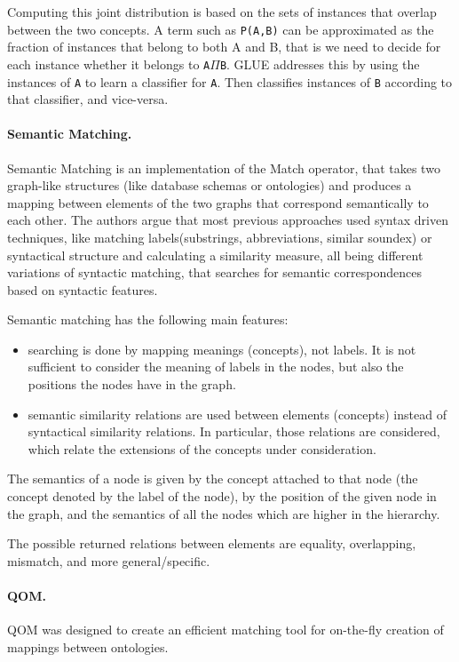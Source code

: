 \documentclass{fast_latex}
\begin{document}
Computing this joint distribution is based on the sets of instances that
overlap between the two concepts. A term such as
\texttt{P(A,B)} can be approximated as the fraction of
instances that belong to both A and B, that is we need to decide for
each instance whether it belongs to \texttt{A${\Pi}$B}.
GLUE addresses this by using the instances of \texttt{A}
to learn a classifier for \texttt{A}. Then classifies
instances of \texttt{B} according to that classifier, and
vice-versa.

\paragraph{Semantic Matching.}
Semantic Matching \cite{giunchiglia2004semantic_matching} is an implementation of
the Match operator, that takes two graph-like structures (like database
schemas or ontologies) and produces a mapping between elements of the
two graphs that correspond semantically to each other. The authors
argue that most previous approaches used syntax driven techniques, like
matching labels(substrings, abbreviations, similar soundex) or
syntactical structure and calculating a similarity measure, all being
different variations of syntactic matching, that searches for semantic
correspondences based on syntactic features. 

Semantic matching has the following main features: 

\begin{itemize}
\item searching is done by mapping meanings (concepts), not labels. It
is not sufficient to consider the meaning of labels in the nodes, but
also the positions the nodes have in the graph. 
\item semantic similarity relations are used between elements (concepts)
instead of syntactical similarity relations. In particular, those
relations are considered, which relate the extensions of the concepts
under consideration. 
\end{itemize}
The semantics of a node is given by the concept attached to that node
(the concept denoted by the label of the node), by the position of the
given node in the graph, and the semantics of all the nodes which are
higher in the hierarchy. 

The possible returned relations between elements are equality,
overlapping, mismatch, and more general/specific. 

\paragraph{QOM.}
QOM \cite{ehrig2004qom} was designed to create an efficient matching
tool for on-the-fly creation of mappings between ontologies. 
\end{document}
